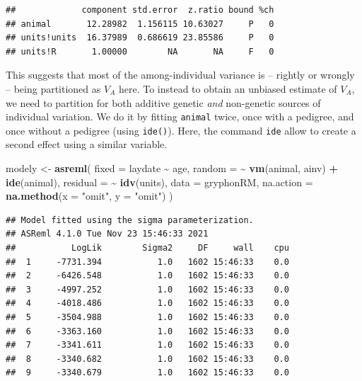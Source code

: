 \documentclass[
  12pt,
]{book}
\newenvironment{Shaded}{\begin{snugshade}}{\end{snugshade}}
\newcommand{\DataTypeTok}[1]{\textcolor[rgb]{0.13,0.29,0.53}{#1}}
\newcommand{\KeywordTok}[1]{\textcolor[rgb]{0.13,0.29,0.53}{\textbf{#1}}}
\newcommand{\NormalTok}[1]{#1}
\newcommand{\OperatorTok}[1]{\textcolor[rgb]{0.81,0.36,0.00}{\textbf{#1}}}
\newcommand{\StringTok}[1]{\textcolor[rgb]{0.31,0.60,0.02}{#1}}
\begin{document}
\begin{Shaded}
\end{Shaded}

\begin{verbatim}
##             component std.error  z.ratio bound %ch
## animal       12.28982  1.156115 10.63027     P   0
## units!units  16.37989  0.686619 23.85586     P   0
## units!R       1.00000        NA       NA     F   0
\end{verbatim}

This suggests that most of the among-individual variance is -- rightly or wrongly -- being partitioned as \(V_A\) here. To instead to obtain an unbiased estimate of \(V_A\), we need to partition for both additive genetic \emph{and} non-genetic sources of individual variation. We do it by fitting \texttt{animal} twice, once with a pedigree, and once without a pedigree (using \texttt{ide()}).
Here, the command \texttt{ide} allow to create a second effect using a similar variable.

\begin{Shaded}
\begin{Highlighting}[]
\NormalTok{modely \textless{}{-}}\StringTok{ }\KeywordTok{asreml}\NormalTok{(}
  \DataTypeTok{fixed =}\NormalTok{ laydate }\OperatorTok{\textasciitilde{}}\StringTok{ }\NormalTok{age,}
  \DataTypeTok{random =} \OperatorTok{\textasciitilde{}}\StringTok{ }\KeywordTok{vm}\NormalTok{(animal, ainv) }\OperatorTok{+}\StringTok{ }\KeywordTok{ide}\NormalTok{(animal),}
  \DataTypeTok{residual =} \OperatorTok{\textasciitilde{}}\StringTok{ }\KeywordTok{idv}\NormalTok{(units),}
  \DataTypeTok{data =}\NormalTok{ gryphonRM,}
  \DataTypeTok{na.action =} \KeywordTok{na.method}\NormalTok{(}\DataTypeTok{x =} \StringTok{"omit"}\NormalTok{, }\DataTypeTok{y =} \StringTok{"omit"}\NormalTok{)}
\NormalTok{)}
\end{Highlighting}
\end{Shaded}

\begin{verbatim}
## Model fitted using the sigma parameterization.
## ASReml 4.1.0 Tue Nov 23 15:46:33 2021
##           LogLik        Sigma2     DF     wall    cpu
##  1     -7731.394           1.0   1602 15:46:33    0.0
##  2     -6426.548           1.0   1602 15:46:33    0.0
##  3     -4997.252           1.0   1602 15:46:33    0.0
##  4     -4018.486           1.0   1602 15:46:33    0.0
##  5     -3504.988           1.0   1602 15:46:33    0.0
##  6     -3363.160           1.0   1602 15:46:33    0.0
##  7     -3341.611           1.0   1602 15:46:33    0.0
##  8     -3340.682           1.0   1602 15:46:33    0.0
##  9     -3340.679           1.0   1602 15:46:33    0.0
\end{verbatim}
\end{document}
